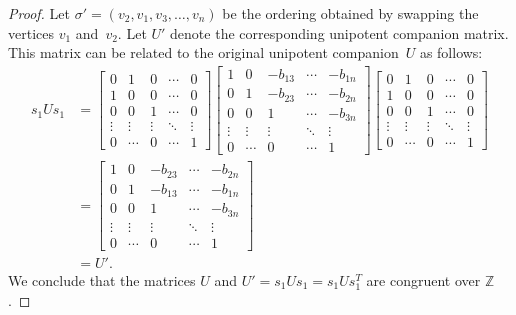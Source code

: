 \documentclass[11pt, letterpaper]{amsart}
\theoremstyle{definition}
\numberwithin{equation}{section}
\def\ZZ{{\mathbb Z}}
\begin{document}
\begin{proof}
Let $\sigma'=(v_2,v_1,v_3,\dots,v_n)$ be the ordering obtained by swapping the vertices $v_1$ and~$v_2$.
Let $U'$ denote the corresponding unipotent companion matrix. 
This matrix can be related to the original unipotent companion~$U$ as follows: 
\begin{align*}
s_1 U s_1 &=
\begin{bmatrix}
0 & 1 & 0 &\cdots  & 0 \\
1 & 0 & 0 & \cdots  & 0 \\
0 & 0 & 1 & \cdots & 0\\
\vdots & \vdots & \vdots & \ddots & \vdots  \\
0 & \cdots & 0 & \cdots & 1
\end{bmatrix}
\begin{bmatrix}
1 & 0 & -b_{13} &\cdots  & -b_{1n} \\
0 & 1 & -b_{23} & \cdots  & -b_{2n} \\
0 & 0 & 1 & \cdots & -b_{3n}\\
\vdots & \vdots & \vdots & \ddots & \vdots  \\
0 & \cdots & 0 & \cdots & 1
\end{bmatrix}
\begin{bmatrix}
0 & 1 & 0 &\cdots  & 0 \\
1 & 0 & 0 & \cdots  & 0 \\
0 & 0 & 1 & \cdots & 0\\
\vdots & \vdots & \vdots & \ddots & \vdots  \\
0 & \cdots & 0 & \cdots & 1
\end{bmatrix} 
\\
&= 
\begin{bmatrix}
1 & 0 & -b_{23} &\cdots  & -b_{2n} \\
0 & 1 & -b_{13} & \cdots  & -b_{1n} \\
0 & 0 & 1 & \cdots & -b_{3n}\\
\vdots & \vdots & \vdots & \ddots & \vdots  \\
0 & \cdots & 0 & \cdots & 1
\end{bmatrix}
\\
&=U'. 
\end{align*}
We conclude that the matrices $U$ and $U'=s_1Us_1=s_1Us_1^T$ are congruent over $\ZZ$.
\end{proof}
\end{document}

